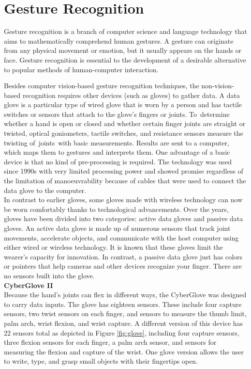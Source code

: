 \section{Gesture Recognition}
Gesture recognition is a branch of computer science and language technology that aims to mathematically comprehend human gestures. A gesture can originate from any physical movement or emotion, but it usually appears on the hands or face. \cite{smith2022hand} Gesture recognition is essential to the development of a desirable alternative to popular methods of human-computer interaction.

 Besides computer vision-based gesture recognition techniques, the non-vision-based recognition requires other devices (such as gloves) to gather data. \cite{bhuyan2017review}
A data glove is a particular type of wired glove that is worn by a person and has tactile switches or sensors that attach to the glove's fingers or joints. To determine whether a hand is open or closed and whether certain finger joints are straight or twisted, optical goniometers, tactile switches, and resistance sensors measure the twisting of joints with basic measurements. Results are sent to a computer, which maps them to gestures and interprets them. One advantage of a basic device is that no kind of pre-processing is required. The technology was used since 1990s with very limited processing power and showed promise  regardless of the limitation of manoeuvrability because of cables that were used to connect the data glove to the computer. \cite{premaratne2014human}
\\
In contrast to earlier gloves, some gloves made with wireless technology can now be worn comfortably thanks to technological advancements. Over the years, gloves have been divided into two categories: active data gloves and passive data gloves. An active data glove is made up of numerous sensors that track joint movements, accelerate objects, and communicate with the host computer using either wired or wireless technology. It is known that these gloves limit the wearer's capacity for innovation. In contrast, a passive data glove just has colors or pointers that help cameras and other devices recognize your finger. There are no sensors built into the glove.\\

\textbf{CyberGlove II}\label{txt:glove}\\
Because the hand's joints can flex in different ways, the CyberGlove was designed to carry data inputs. The glove has eighteen sensors. These include four capture sensors, two twist sensors on each finger, and sensors to measure the thumb limit, palm arch, wrist flexion, and wrist capture. A different version of this device has 22 sensors total  as depicted in Figure \ref{fig:glove}, including four capture sensors, three flexion sensors for each finger, a palm arch sensor, and sensors for measuring the flexion and capture of the wrist. One glove version allows the user to write, type, and grasp small objects with their fingertips open.

